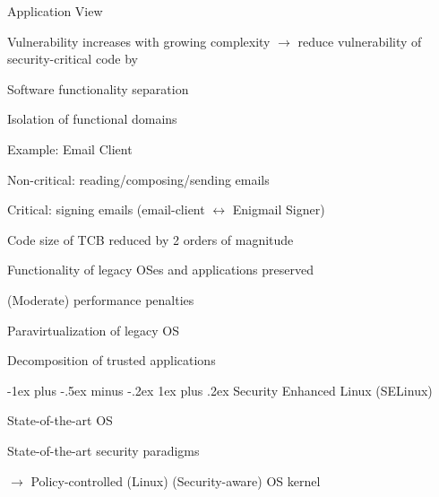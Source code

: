 \documentclass[a4paper]{article}
\makeatletter
\renewcommand{\subsubsection}{\@startsection{subsubsection}{3}{0mm}%
                {-1ex plus -.5ex minus -.2ex}%
                {1ex plus .2ex}%
                {\normalfont\small\bfseries}}
\makeatother
\begin{document}
\begin{multicols}{3}
    Application View
    \begin{itemize*}
        \item Vulnerability increases with growing complexity $\rightarrow$ reduce vulnerability of security-critical code by
        \item Software functionality separation
        \item Isolation of functional domains %
        \item Example: Email Client
        \begin{itemize*}
            \item Non-critical: reading/composing/sending emails
            \item Critical: signing emails (email-client $\leftrightarrow$ Enigmail Signer)
        \end{itemize*}
    \end{itemize*}


    \begin{itemize*}
        \item Code size of TCB reduced by 2 orders of magnitude
        \item Functionality of legacy OSes and applications preserved
        \item (Moderate) performance penalties
        \item Paravirtualization of legacy OS
        \item Decomposition of trusted applications
    \end{itemize*}

    \subsubsection{Security Enhanced Linux (SELinux)}
    \begin{itemize*}
        \item State-of-the-art OS
        \item State-of-the-art security paradigms
        \item[$\rightarrow$] Policy-controlled (Linux) (Security-aware) OS kernel
    \end{itemize*}


\end{multicols}
\end{document}
